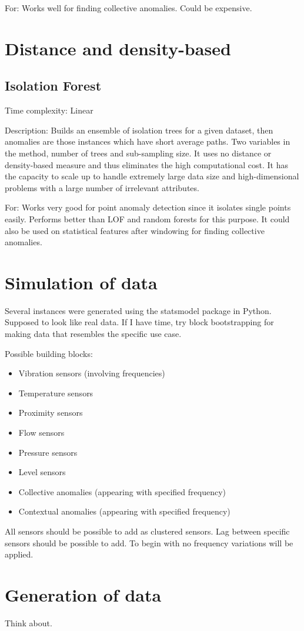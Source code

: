 For:
Works well for finding collective anomalies. Could be expensive.




\section{Distance and density-based}

\subsection{Isolation Forest }

Time complexity: 
Linear

Description: 
Builds an ensemble of isolation trees for a given dataset, then anomalies are those instances which have short average paths. Two variables in the method, number of trees and sub-sampling size. It uses no distance or density-based measure and thus eliminates the high computational cost. It has the capacity to scale up to handle extremely large data size and high-dimensional problems with a large number of irrelevant attributes. 

For: 
Works very good for point anomaly detection since it isolates single points easily. Performs better than LOF and random forests for this purpose. It could also be used on statistical features after windowing for finding collective anomalies.

\section{Simulation of data}
Several instances were generated using the statsmodel package in Python. 
Supposed to look like real data. If I have time, try block bootstrapping for making data that resembles the specific use case.

Possible building blocks:
\begin{itemize}
\item Vibration sensors (involving frequencies)
\item Temperature sensors 
\item Proximity sensors
\item Flow sensors
\item Pressure sensors
\item Level sensors
\item Collective anomalies (appearing with specified frequency)
\item Contextual anomalies (appearing with specified frequency)
\end{itemize}
All sensors should be possible to add as clustered sensors. Lag between specific sensors should be possible to add. To begin with no frequency variations will be applied. 

\section{Generation of data}
Think about.



